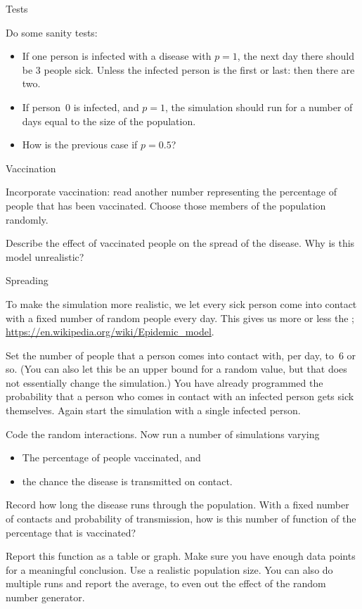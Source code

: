 {Tests}

Do some sanity tests:
\begin{itemize}
\item If one person is infected with a disease with $p=1$,
  the next day there should be 3 people sick.
  Unless the infected person is the first or last: then there are two.
\item If person~0 is infected, and $p=1$, the simulation
  should run for a number of days equal to the size of the population.
\item How is the previous case if $p=0.5$?
\end{itemize}

 {Vaccination}

\begin{exercise}
  \label{ex:infect:2}
  Incorporate vaccination: read another number representing the
  percentage of people that has been vaccinated. Choose those members
  of the population randomly.

  Describe the effect of vaccinated people on the spread of the
  disease. Why is this model unrealistic?
\end{exercise}

 {Spreading}
\label{sec:infect-spread}

To make the simulation more realistic, we let every sick person come
into contact with a fixed number of random people every day. This
gives us more or less the ;
\url{https://en.wikipedia.org/wiki/Epidemic_model}.

Set the number of people that a person comes into contact with, per
day, to~6 or so. (You can also let this be an upper bound for a random
value, but that
does not essentially change the simulation.) You have already programmed the probability that a
person who comes in contact with an infected person gets sick themselves.
Again start the simulation with a single infected person.

\begin{exercise}
  \label{ex:infect:3}
  Code the random interactions. Now run a number of simulations varying
  \begin{itemize}
  \item The percentage of people vaccinated, and
  \item the chance the disease is transmitted on contact.
  \end{itemize}
  Record how long the disease runs through the population. With a
  fixed number of contacts and probability of transmission, how is
  this number of function of the percentage that is vaccinated?

  Report this function as a table or graph. Make sure you have enough
  data points for a meaningful conclusion. Use a realistic population size.
  You can also do multiple runs and report the average, to even out
  the effect of the random number generator.
\end{exercise}

